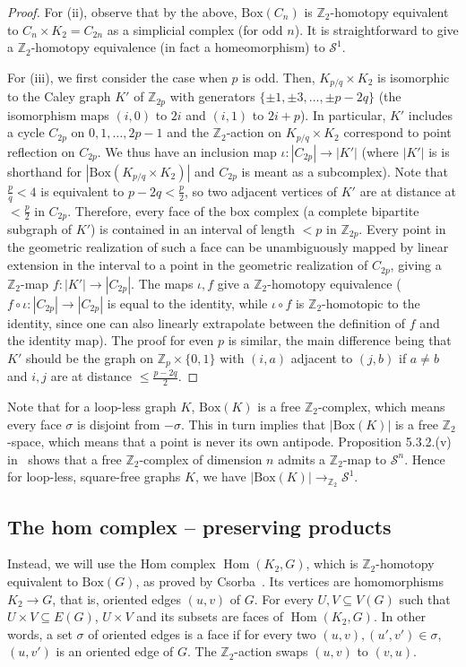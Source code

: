 \documentclass[11pt,a4paper]{scrartcl}
\numberwithin{theorem}{section}
\theoremstyle{definition}
\newcommand{\ZZ}{\mathbb{Z}}
\newcommand\Sphere{\mathcal{S}}
\DeclareMathOperator{\Hom}{Hom}
\newcommand\Bx[1]{\mathrm{Box}(#1)}
\newcommand\BBox[1]{\left|\mathrm{Box}(#1)\right|}
\begin{document}
\begin{proof}
	
	For (ii), observe that by the above, $\Bx{C_n}$ is $\ZZ_2$-homotopy equivalent to $C_n \times K_2 = C_{2n}$ as a simplicial complex (for odd $n$).
	It is straightforward to give a $\ZZ_2$-homotopy equivalence (in fact a homeomorphism) to $\Sphere^1$.

	For (iii), we first consider the case when $p$ is odd.
	Then, $K_{p/q} \times K_2$ is isomorphic to the Caley graph $K'$ of $\ZZ_{2p}$ with generators $\{\pm 1,\pm 3,\dots,\pm p-2q\}$ (the isomorphism maps $(i,0)$ to $2i$ and $(i,1)$ to $2i+p$).
	In particular, $K'$ includes a cycle $C_{2p}$ on $0,1,\dots,2p-1$
	and the $\ZZ_2$-action on $K_{p/q} \times K_2$ correspond to point reflection on $C_{2p}$.
	We thus have an inclusion map $\iota\colon |C_{2p}| \to |K'|$ (where $|K'|$ is is shorthand for $\BBox{K_{p/q}\times K_2}$ and $C_{2p}$ is meant as a subcomplex).
	Note that $\frac{p}{q} < 4$ is equivalent to $p-2q < \frac{p}{2}$, so two adjacent vertices of $K'$ are at distance at $<\frac{p}{2}$ in $C_{2p}$.
	Therefore, every face of the box complex (a complete bipartite subgraph of $K'$) is contained in an interval of length $<p$ in $\ZZ_{2p}$.
	Every point in the geometric realization of such a face can be unambiguously mapped by linear extension in the interval
	to a point in the geometric realization of $C_{2p}$, giving a $\ZZ_2$-map $f \colon |K'| \to |C_{2p}|$.
	The maps $\iota,f$ give a $\ZZ_2$-homotopy equivalence ($f \circ \iota \colon |C_{2p}|\to |C_{2p}|$ is equal to the identity, while $\iota \circ f$ is $\ZZ_2$-homotopic to the identity, since one can also linearly extrapolate between the definition of $f$ and the identity map).
	The proof for even $p$ is similar, the main difference being that $K'$ should be the graph on $\ZZ_p \times \{0,1\}$ with $(i,a)$ adjacent to $(j,b)$ if $a\neq b$ and $i,j$ are at distance $\leq\frac{p-2q}{2}$.
\end{proof}

Note that for a loop-less graph $K$, $\Bx{K}$ is a free $\ZZ_2$-complex, which means every face $\sigma$ is disjoint from $-\sigma$.
This in turn implies that $\BBox{K}$ is a free $\ZZ_2$-space, which means that a point is never its own antipode.
Proposition 5.3.2.(v) in~\cite{matousek2008using} shows that a free $\ZZ_2$-complex of dimension $n$ admits a $\ZZ_2$-map to $\Sphere^n$.
Hence for loop-less, square-free graphs $K$, we have $\BBox{K} \to_{\ZZ_2} \Sphere^1$.

\subsection*{The hom complex -- preserving products}
Instead, we will use the Hom complex $\Hom(K_2,G)$, which is $\ZZ_2$-homotopy equivalent to $\Bx{G}$,
as proved by Csorba~\cite{Csorba08}.
Its vertices are homomorphisms $K_2 \to G$, that is, oriented edges $(u,v)$ of $G$.
For every $U,V \subseteq V(G)$ such that $U \times V \subseteq E(G)$, $U \times V$ and its subsets are faces of $\Hom(K_2,G)$.
In other words, a set $\sigma$ of oriented edges is a face if for every two $(u,v), (u',v') \in \sigma$, $(u,v')$ is an oriented edge of $G$.
The $\ZZ_2$-action swaps $(u,v)$ to $(v,u)$.
\end{document}
